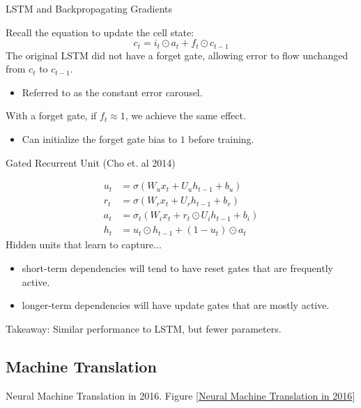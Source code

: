 \documentclass[english]{article}
\begin{document}
\item 
 {LSTM and Backpropagating Gradients}

Recall the equation to update the cell state:
$$c_t = i_t\odot a_t +f_t\odot c_{t-1}$$
The original LSTM did not have a forget gate, allowing error to flow unchanged from $c_t$ to $c_{t-1}$.
\begin{itemize}
\item Referred to as the constant error carousel.
\end{itemize}
With a forget gate, if $f_t\approx 1$, we achieve the same effect.
\begin{itemize}
\item Can initialize the forget gate bias to $1$ before training.
\end{itemize}
 

\item 
 {Gated Recurrent Unit (Cho et. al 2014)}


\begin{align*}
u_t &= \sigma(W_ux_t+U_uh_{t-1}+b_u)\\
r_t &= \sigma(W_rx_t+U_rh_{t-1}+b_r)\\
a_t &= \sigma_t(W_ix_t+r_t\odot U_ih_{t-1}+b_i)\\
h_t &= u_t\odot h_{t-1} + (1-u_t)\odot a_t
\end{align*}
Hidden units that learn to capture...
\begin{itemize}
\item short-term dependencies will tend to have reset gates that are frequently active. 
\item longer-term dependencies will have update gates that are mostly active.
\end{itemize}
Takeaway: Similar performance to LSTM, but fewer parameters.
 \eenum
 

\subsection{Machine Translation}
\benum
\item 
 {Neural Machine Translation in 2016}.  Figure \ref{Neural Machine Translation in 2016}
\end{document}
